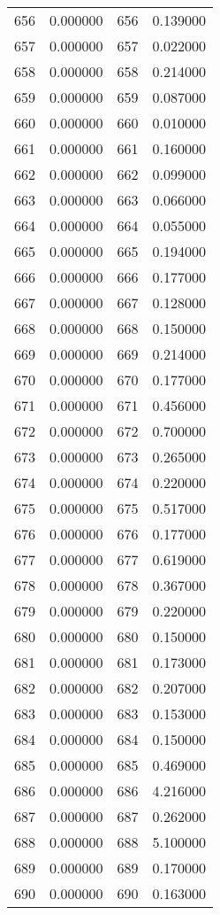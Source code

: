 \documentclass[12pt]{article}
\begin{document}
\begin{longtable}{@{}cccc@{}}
656 & 0.000000 & 656 & 0.139000 \\
657 & 0.000000 & 657 & 0.022000 \\
658 & 0.000000 & 658 & 0.214000 \\
659 & 0.000000 & 659 & 0.087000 \\
660 & 0.000000 & 660 & 0.010000 \\
661 & 0.000000 & 661 & 0.160000 \\
662 & 0.000000 & 662 & 0.099000 \\
663 & 0.000000 & 663 & 0.066000 \\
664 & 0.000000 & 664 & 0.055000 \\
665 & 0.000000 & 665 & 0.194000 \\
666 & 0.000000 & 666 & 0.177000 \\
667 & 0.000000 & 667 & 0.128000 \\
668 & 0.000000 & 668 & 0.150000 \\
669 & 0.000000 & 669 & 0.214000 \\
670 & 0.000000 & 670 & 0.177000 \\
671 & 0.000000 & 671 & 0.456000 \\
672 & 0.000000 & 672 & 0.700000 \\
673 & 0.000000 & 673 & 0.265000 \\
674 & 0.000000 & 674 & 0.220000 \\
675 & 0.000000 & 675 & 0.517000 \\
676 & 0.000000 & 676 & 0.177000 \\
677 & 0.000000 & 677 & 0.619000 \\
678 & 0.000000 & 678 & 0.367000 \\
679 & 0.000000 & 679 & 0.220000 \\
680 & 0.000000 & 680 & 0.150000 \\
681 & 0.000000 & 681 & 0.173000 \\
682 & 0.000000 & 682 & 0.207000 \\
683 & 0.000000 & 683 & 0.153000 \\
684 & 0.000000 & 684 & 0.150000 \\
685 & 0.000000 & 685 & 0.469000 \\
686 & 0.000000 & 686 & 4.216000 \\
687 & 0.000000 & 687 & 0.262000 \\
688 & 0.000000 & 688 & 5.100000 \\
689 & 0.000000 & 689 & 0.170000 \\
690 & 0.000000 & 690 & 0.163000 \\

\end{longtable}
\end{document}
